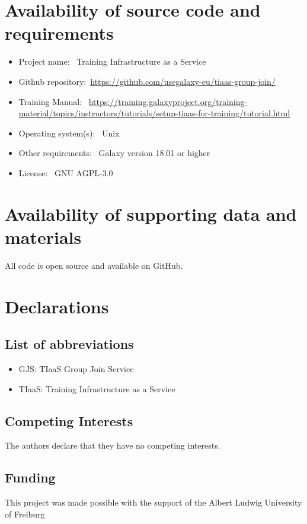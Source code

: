 \documentclass[a4paper,num-refs]{oup-contemporary}
\begin{document}
\section{Availability of source code and requirements}

\begin{itemize}
\item Project name: ~Training Infrastructure as a Service
\item Github repository:~\url{https://github.com/usegalaxy-eu/tiaas-group-join/}
\item Training Manual: ~\url{https://training.galaxyproject.org/training-material/topics/instructors/tutorials/setup-tiaas-for-training/tutorial.html}
\item Operating system(s): ~Unix
\item Other requirements: ~Galaxy version 18.01 or higher
\item License: ~GNU AGPL-3.0
\end{itemize}

\section{Availability of supporting data and materials}
All code is open source and available on GitHub.

\section{Declarations}

\subsection{List of abbreviations}

\begin{itemize}
\item GJS: TIaaS Group Join Service
\item TIaaS: Training Infrastructure as a Service
\end{itemize}


\subsection{Competing Interests}
The authors declare that they have no competing interests.


\subsection{Funding}
This project was made possible with the support of the Albert Ludwig University of Freiburg
\end{document}
